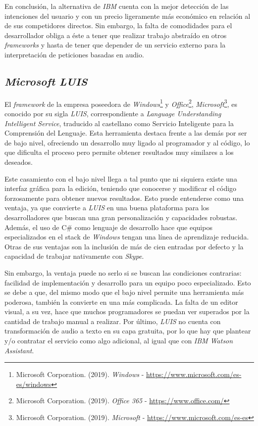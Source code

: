\documentclass[11pt,spanish,listoffigures]{tfgetsinf}
\begin{document}
En conclusión, la alternativa de \textit{IBM} cuenta con la mejor detección de las intenciones del usuario y con un precio ligeramente más económico en relación al de sus competidores directos. Sin embargo, la falta de comodidades para el desarrollador obliga a éste a tener que realizar trabajo abstraído en otros \textit{frameworks} y hasta de tener que depender de un servicio externo para la interpretación de peticiones basadas en audio.

\subsection{\textit{Microsoft LUIS}}
\label{sec:microsfot-luis}

El \textit{framework} de la empresa poseedora de \textit{Windows}\footnote{Microsoft Corporation. (2019). \textit{Windows} - \url{https://www.microsoft.com/es-es/windows}} y \textit{Office}\footnote{Microsoft Corporation. (2019). \textit{Office 365} - \url{ https://www.office.com/}}, \textit{Microsoft}\footnote{Microsoft Corporation. (2019). \textit{Microsoft} - \url{https://www.microsoft.com/es-es}}, es conocido por su sigla \textit{LUIS}, correspondiente a \textit{Language Understanding Intelligent Service}, traducido al castellano como Servicio Inteligente para la Comprensión del Lenguaje. Esta herramienta destaca frente a las demás por ser de bajo nivel, ofreciendo un desarrollo muy ligado al programador y al código, lo que dificulta el proceso pero permite obtener resultados muy similares a los deseados.

Este casamiento con el bajo nivel llega a tal punto que ni siquiera existe una interfaz gráfica para la edición, teniendo que conocerse y modificar el código forzosamente para obtener nuevos resultados. Esto puede entenderse como una ventaja, ya que convierte a \textit{LUIS} en una buena plataforma para los desarrolladores que buscan una gran personalización y capacidades robustas. Además, el uso de C\# como lenguaje de desarrollo hace que equipos especializados en el stack de \textit{Windows} tengan una línea de aprendizaje reducida. Otras de sus ventajas son la inclusión de más de cien entradas por defecto y la capacidad de trabajar nativamente con \textit{Skype}.

Sin embargo, la ventaja puede no serlo si se buscan las condiciones contrarias: facilidad de implementación y desarrollo para un equipo poco especializado. Esto se debe a que, del mismo modo que el bajo nivel permite una herramienta más poderosa, también la convierte en una más complicada. La falta de un editor visual, a su vez, hace que muchos programadores se puedan ver superados por la cantidad de trabajo manual a realizar. Por último, \textit{LUIS} no cuenta con transformación de audio a texto en su capa gratuita, por lo que hay que plantear y/o contratar el servicio como algo adicional, al igual que con \textit{IBM Watson Assistant}.
\end{document}
